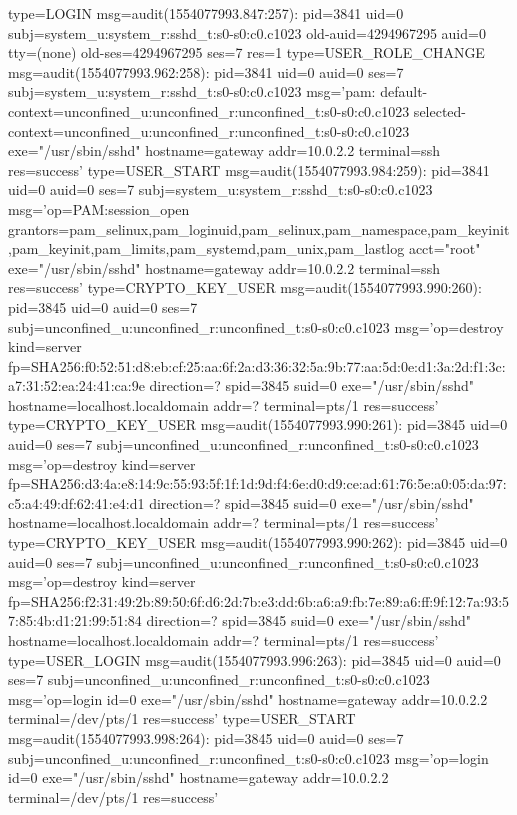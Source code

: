 \documentclass[]{report}
\newenvironment{Shaded}{}{}
\newcommand{\NormalTok}[1]{#1}
\begin{document}
\begin{Shaded}
\begin{Highlighting}[]
\NormalTok{type=LOGIN msg=audit(1554077993.847:257): pid=3841 uid=0 subj=system_u:system_r:sshd_t:s0-s0:c0.c1023 old-auid=4294967295 auid=0 tty=(none) old-ses=4294967295 ses=7 res=1}
\NormalTok{type=USER_ROLE_CHANGE msg=audit(1554077993.962:258): pid=3841 uid=0 auid=0 ses=7 subj=system_u:system_r:sshd_t:s0-s0:c0.c1023 msg='pam: default-context=unconfined_u:unconfined_r:unconfined_t:s0-s0:c0.c1023 selected-context=unconfined_u:unconfined_r:unconfined_t:s0-s0:c0.c1023 exe="/usr/sbin/sshd" hostname=gateway addr=10.0.2.2 terminal=ssh res=success'}
\NormalTok{type=USER_START msg=audit(1554077993.984:259): pid=3841 uid=0 auid=0 ses=7 subj=system_u:system_r:sshd_t:s0-s0:c0.c1023 msg='op=PAM:session_open grantors=pam_selinux,pam_loginuid,pam_selinux,pam_namespace,pam_keyinit,pam_keyinit,pam_limits,pam_systemd,pam_unix,pam_lastlog acct="root" exe="/usr/sbin/sshd" hostname=gateway addr=10.0.2.2 terminal=ssh res=success'}
\NormalTok{type=CRYPTO_KEY_USER msg=audit(1554077993.990:260): pid=3845 uid=0 auid=0 ses=7 subj=unconfined_u:unconfined_r:unconfined_t:s0-s0:c0.c1023 msg='op=destroy kind=server fp=SHA256:f0:52:51:d8:eb:cf:25:aa:6f:2a:d3:36:32:5a:9b:77:aa:5d:0e:d1:3a:2d:f1:3c:a7:31:52:ea:24:41:ca:9e direction=? spid=3845 suid=0  exe="/usr/sbin/sshd" hostname=localhost.localdomain addr=? terminal=pts/1 res=success'}
\NormalTok{type=CRYPTO_KEY_USER msg=audit(1554077993.990:261): pid=3845 uid=0 auid=0 ses=7 subj=unconfined_u:unconfined_r:unconfined_t:s0-s0:c0.c1023 msg='op=destroy kind=server fp=SHA256:d3:4a:e8:14:9c:55:93:5f:1f:1d:9d:f4:6e:d0:d9:ce:ad:61:76:5e:a0:05:da:97:c5:a4:49:df:62:41:e4:d1 direction=? spid=3845 suid=0  exe="/usr/sbin/sshd" hostname=localhost.localdomain addr=? terminal=pts/1 res=success'}
\NormalTok{type=CRYPTO_KEY_USER msg=audit(1554077993.990:262): pid=3845 uid=0 auid=0 ses=7 subj=unconfined_u:unconfined_r:unconfined_t:s0-s0:c0.c1023 msg='op=destroy kind=server fp=SHA256:f2:31:49:2b:89:50:6f:d6:2d:7b:e3:dd:6b:a6:a9:fb:7e:89:a6:ff:9f:12:7a:93:57:85:4b:d1:21:99:51:84 direction=? spid=3845 suid=0  exe="/usr/sbin/sshd" hostname=localhost.localdomain addr=? terminal=pts/1 res=success'}
\NormalTok{type=USER_LOGIN msg=audit(1554077993.996:263): pid=3845 uid=0 auid=0 ses=7 subj=unconfined_u:unconfined_r:unconfined_t:s0-s0:c0.c1023 msg='op=login id=0 exe="/usr/sbin/sshd" hostname=gateway addr=10.0.2.2 terminal=/dev/pts/1 res=success'}
\NormalTok{type=USER_START msg=audit(1554077993.998:264): pid=3845 uid=0 auid=0 ses=7 subj=unconfined_u:unconfined_r:unconfined_t:s0-s0:c0.c1023 msg='op=login id=0 exe="/usr/sbin/sshd" hostname=gateway addr=10.0.2.2 terminal=/dev/pts/1 res=success'}

\end{Highlighting}
\end{Shaded}
\end{document}
